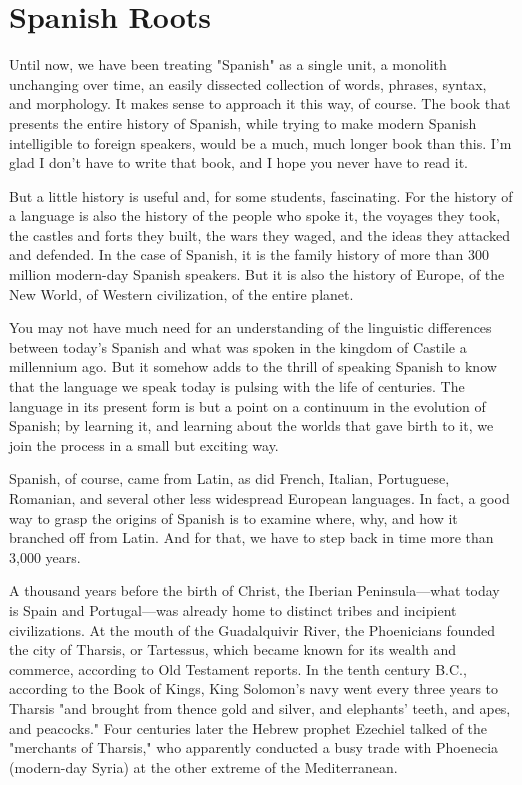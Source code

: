 \chapter{Spanish Roots}

Until now, we have been treating "Spanish" as a single unit,
a monolith unchanging over time, an easily dissected collection of
words, phrases, syntax, and morphology. It makes sense to approach it
this way, of course. The book that presents the entire history of Spanish, while trying to make modern Spanish intelligible to foreign speakers, would be a much, much longer book than this. I'm glad I don't
have to write that book, and I hope you never have to read it.

But a little history is useful and, for some students, fascinating. For the history of a language is also the history of the people who
spoke it, the voyages they took, the castles and forts they built, the
wars they waged, and the ideas they attacked and defended. In the case
of Spanish, it is the family history of more than 300 million modern-day Spanish speakers. But it is also the history of Europe, of the New
World, of Western civilization, of the entire planet.

You may not have much need for an understanding of the linguistic differences between today's Spanish and what was spoken in
the kingdom of Castile a millennium ago. But it somehow adds to the
thrill of speaking Spanish to know that the language we speak today is
pulsing with the life of centuries. The language in its present form is
but a point on a continuum in the evolution of Spanish; by learning it,
and learning about the worlds that gave birth to it, we join the process
in a small but exciting way.

Spanish, of course, came from Latin, as did French, Italian,
Portuguese, Romanian, and several other less widespread European
languages. In fact, a good way to grasp the origins of Spanish is to examine where, why, and how it branched off from Latin. And for that,
we have to step back in time more than 3,000 years.

A thousand years before the birth of Christ, the Iberian Peninsula---what today is Spain and Portugal---was already home to distinct tribes and incipient civilizations. At the mouth of the Guadalquivir River, the Phoenicians founded the city of Tharsis, or Tartessus,
which became known for its wealth and commerce, according to Old
Testament reports. In the tenth century B.C., according to the Book
of Kings, King Solomon's navy went every three years to Tharsis
"and brought from thence gold and silver, and elephants' teeth, and
apes, and peacocks." Four centuries later the Hebrew prophet Ezechiel
talked of the "merchants of Tharsis," who apparently conducted a
busy trade with Phoenecia (modern-day Syria) at the other extreme of
the Mediterranean.

